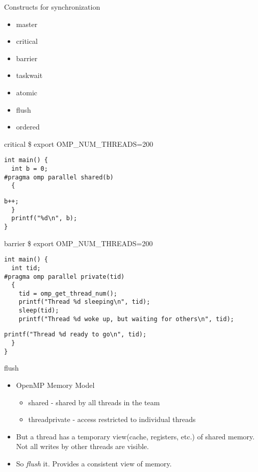 \documentclass[10pt]{beamer}
\begin{document}
\begin{frame}{Constructs for synchronization}
\begin{itemize}
\item master
\item critical
\item barrier
\item taskwait
\item atomic
\item flush
\item ordered
\end{itemize}
\end{frame}

\begin{frame}[fragile]{critical}
\$ export OMP\_NUM\_THREADS=200
\begin{Verbatim}[fontsize=\small, formatcom=\color{red}]
int main() {        
  int b = 0;
#pragma omp parallel shared(b)
  {
\end{Verbatim}
\begin{Verbatim}[fontsize=\small, formatcom=\color{red}]
    b++;
  }
  printf("%d\n", b);
}
\end{Verbatim}
\end{frame}

\begin{frame}[fragile]{barrier}
\$ export OMP\_NUM\_THREADS=200
\begin{Verbatim}[fontsize=\small, formatcom=\color{red}]
int main() {
  int tid;
#pragma omp parallel private(tid)
  {
    tid = omp_get_thread_num();
    printf("Thread %d sleeping\n", tid);
    sleep(tid);
    printf("Thread %d woke up, but waiting for others\n", tid);
\end{Verbatim}
\begin{Verbatim}[fontsize=\small, formatcom=\color{red}]
    printf("Thread %d ready to go\n", tid);
  }
}
\end{Verbatim}
\end{frame}

\begin{frame}{flush}
\begin{itemize}
\item OpenMP Memory Model
  \begin{itemize}
  \item shared - shared by all threads in the team
  \item threadprivate - access restricted to individual threads
  \end{itemize}
\item But a thread has a temporary view(cache, registers, etc.) of shared
  memory. Not all writes by other threads are visible.
\item So \emph{flush} it. Provides a consistent view of memory.
\end{itemize}
\end{frame}
\end{document}
